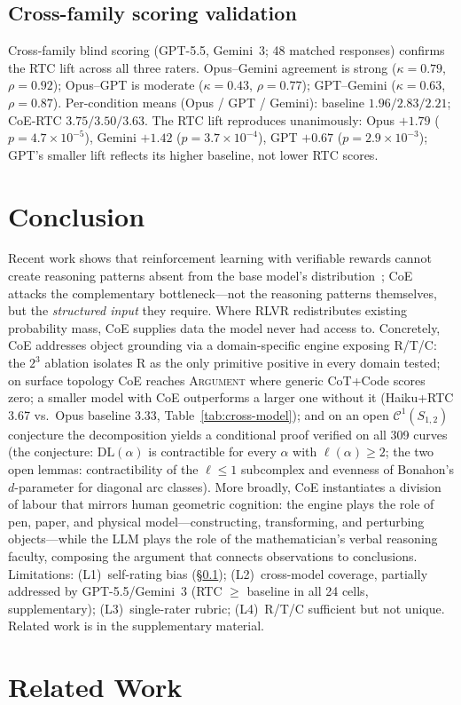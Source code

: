 \documentclass{article}
\begin{document}
\subsection{Cross-family scoring validation}
\label{sec:cross-family}
\label{tab:cross-family}
Cross-family blind scoring (GPT-5.5, Gemini~3; 48 matched responses)
confirms the RTC lift across all three raters. Opus--Gemini agreement is
strong ($\kappa{=}0.79$, $\rho{=}0.92$); Opus--GPT is moderate
($\kappa{=}0.43$, $\rho{=}0.77$); GPT--Gemini ($\kappa{=}0.63$,
$\rho{=}0.87$). Per-condition means (Opus / GPT / Gemini): baseline
$1.96 / 2.83 / 2.21$; CoE-RTC $3.75 / 3.50 / 3.63$. The RTC lift
reproduces unanimously: Opus $+1.79$ ($p{=}4.7{\times}10^{-5}$), Gemini
$+1.42$ ($p{=}3.7{\times}10^{-4}$), GPT $+0.67$ ($p{=}2.9{\times}10^{-3}$);
GPT's smaller lift reflects its higher baseline, not lower RTC scores.

\vspace{-2mm}
\section{Conclusion}
\label{sec:conclusion}\label{sec:discussion}
Recent work shows that reinforcement learning with verifiable rewards cannot
create reasoning patterns absent from the base model's
distribution~\citep{yang2025rlvr}; CoE attacks the complementary
bottleneck---not the reasoning patterns themselves, but the \emph{structured
input} they require. Where RLVR redistributes existing probability mass, CoE
supplies data the model never had access to. Concretely, CoE addresses object
grounding via a domain-specific engine exposing
R/T/C: the $2^3$ ablation isolates R as the only primitive positive in
every domain tested; on surface topology CoE reaches \textsc{Argument}
where generic CoT+Code scores zero; a smaller model with CoE outperforms a larger one without it (Haiku+RTC 3.67 vs.\ Opus baseline 3.33, Table~\ref{tab:cross-model}); and on an open
$\mathcal{C}^1(S_{1,2})$ conjecture the decomposition yields a
conditional proof verified on all 309 curves (the conjecture:
$\mathrm{DL}(\alpha)$ is contractible for every $\alpha$ with
$\ell(\alpha) \ge 2$; the two open lemmas: contractibility of the
$\ell \le 1$ subcomplex and evenness of Bonahon's $d$-parameter for
diagonal arc classes). More broadly, CoE instantiates a division of labour
that mirrors human geometric cognition: the engine plays the role of pen,
paper, and physical model---constructing, transforming, and perturbing
objects---while the LLM plays the role of the mathematician's verbal reasoning
faculty, composing the argument that connects observations to conclusions.
Limitations: (L1)~self-rating bias (\S\ref{sec:cross-family}); (L2)~cross-model coverage, partially addressed by GPT-5.5/Gemini~3 (RTC $\ge$ baseline in all 24 cells, supplementary); (L3)~single-rater rubric; (L4)~R/T/C sufficient but not unique. Related work is in the supplementary material.\label{sec:related}

\newpage




\newpage
\appendix
\section{Related Work}



\end{document}
